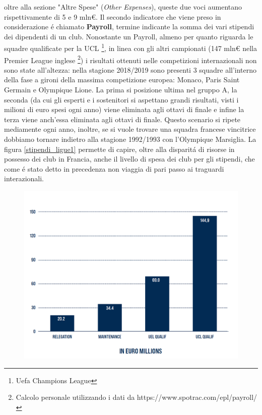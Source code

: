 \documentclass[
    corpo=12pt,
    oneside,
    evenboxes,
    tipotesi=triennale,
    stile=classica,
    oldstyle,
    autoretitolo,
    greek,
]{toptesi}
\begin{document}
\begin{interlinea}{1.5}
oltre alla sezione "Altre Spese" (\emph{Other Expenses}), queste due voci aumentano rispettivamente di 5 e 9 mln€.\newline
Il secondo indicatore che viene preso in considerazione \'e chiamato \textbf{Payroll}, termine indicante la somma dei vari stipendi
dei dipendenti di un club. Nonostante un Payroll, almeno per quanto riguarda le squadre qualificate per la UCL \footnote{Uefa Champions League}, in linea con gli
altri campionati (147 mln€ nella Premier League inglese \footnote{Calcolo personale utilizzando i dati da https://www.spotrac.com/epl/payroll/})
i risultati ottenuti nelle competizioni internazionali non sono state all'altezza: nella stagione 2018/2019 sono presenti 3 squadre 
all'interno della fase a gironi della massima competizione europea: Monaco, Paris Saint Germain e Olympique Lione. La prima si 
posizione ultima nel gruppo A, la seconda (da cui gli esperti e i sostenitori si aspettano grandi risultati, visti i milioni di euro 
spesi ogni anno) viene eliminata agli ottavi di finale e infine la terza viene anch'essa eliminata agli ottavi di finale. Questo scenario
si ripete mediamente ogni anno, inoltre, se si vuole trovare una squadra francese vincitrice dobbiamo tornare indietro alla stagione 1992/1993
con l'Olympique Marsiglia. La figura \ref{stipendi_ligue1} permette di capire, oltre alla disparit\'a di risorse in possesso dei club in Francia, 
anche il livello di spesa dei club per gli stipendi, che come \'e stato detto in precedenza non viaggia di pari passo ai traguardi interazionali.\newline
\begin{figure}
    \centering
    \includegraphics[scale=0.5]{img/stipendi_ligue1.png}

\end{figure}
\end{interlinea}
\end{document}
